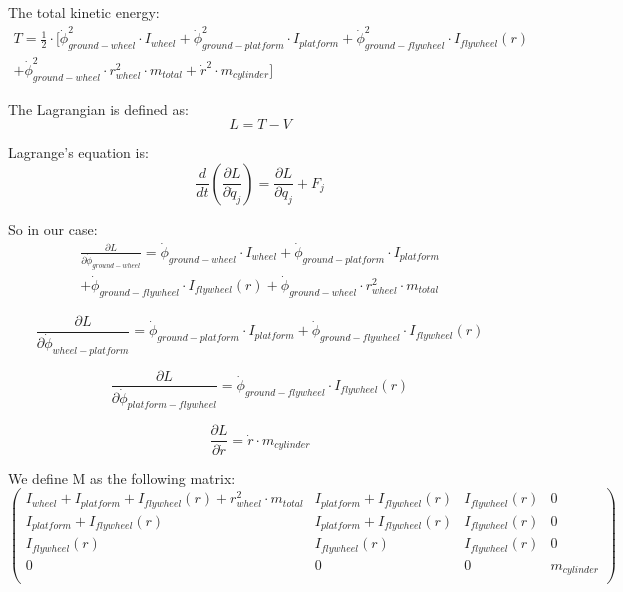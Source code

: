 The total kinetic energy:
\begin{multline}
	T = \frac{1}{2}\cdot[\dot{\phi}_{ground-wheel}^2\cdot I_{wheel}
	+ \dot{\phi}_{ground-platform}^2 \cdot I_{platform}
	+ \dot{\phi}_{ground-flywheel}^2\cdot I_{flywheel}(r)\\
	+ \dot{\phi}_{ground-wheel}^2\cdot r_{wheel}^2\cdot m_{total}
	+ \dot{r}^2\cdot m_{cylinder}]	
\end{multline}

The Lagrangian is defined as:
\begin{equation}
	L=T-V	
\end{equation}

Lagrange's equation is:
\begin{equation}
	\frac{d}{dt}(\frac{\partial L}{\partial \dot{q}_j})=
	\frac{\partial L}{\partial q_j}	+ F_{j}
\end{equation}

So in our case:
\begin{multline}
	\frac{\partial L}{\partial \dot{\phi}_{ground-wheel}}=
	\dot{\phi}_{ground-wheel} \cdot I_{wheel}
	+ \dot{\phi}_{ground-platform} \cdot I_{platform}\\
	+ \dot{\phi}_{ground-flywheel}\cdot I_{flywheel}(r)
	+ \dot{\phi}_{ground-wheel}\cdot r_{wheel}^2\cdot m_{total}
\end{multline}

\begin{equation}
	\frac{\partial L}{\partial \dot{\phi}_{wheel-platform}}=
	\dot{\phi}_{ground-platform} \cdot I_{platform}
	+ \dot{\phi}_{ground-flywheel}\cdot I_{flywheel}(r)
\end{equation}

\begin{equation}
	\frac{\partial L}{\partial \dot{\phi}_{platform-flywheel}}=
	\dot{\phi}_{ground-flywheel}\cdot I_{flywheel}(r)
\end{equation}

\begin{equation}
	\frac{\partial L}{\partial \dot{r}}=
	\dot{r}\cdot m_{cylinder}
\end{equation}

We define M as the following matrix:
\begin{equation}
	\begin{pmatrix} 
		I_{wheel} + I_{platform} + I_{flywheel}(r) + r_{wheel}^2 \cdot m_{total} &
		I_{platform} + I_{flywheel}(r) &
		I_{flywheel}(r)&
		0\\
		I_{platform} + I_{flywheel}(r) &
		I_{platform} + I_{flywheel}(r) &
		I_{flywheel}(r)&
		0\\
		I_{flywheel}(r) &
		I_{flywheel}(r) &
		I_{flywheel}(r) &
		0\\
		0 &
		0 &
		0 &
		m_{cylinder}\\
		\end{pmatrix}
\end{equation}

